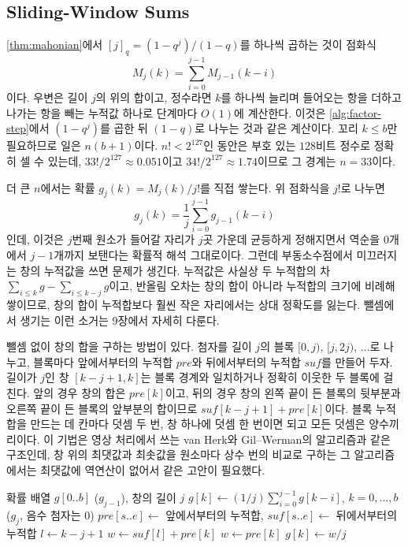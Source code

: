 \subsection{Sliding-Window Sums}

\cref{thm:mahonian}에서 $[j]_q=(1-q^j)/(1-q)$를 하나씩 곱하는 것이 점화식
\[
M_j(k)=\sum_{i=0}^{j-1}M_{j-1}(k-i)
\]
이다. 우변은 길이 $j$의  위의 합이고, 정수라면 $k$를 하나씩 늘리며 들어오는 항을 더하고 나가는 항을 빼는 누적값 하나로 단계마다 $O(1)$에 계산한다. 이것은 \cref{alg:factor-step}에서 $(1-q^j)$를 곱한 뒤 $(1-q)$로 나누는 것과 같은 계산이다. 꼬리 $k\le b$만 필요하므로 일은 $n(b+1)$이다. $n!<2^{127}$인 동안은 부호 있는 $128$비트 정수로 정확히 셀 수 있는데, $33!/2^{127}\approx0.051$이고 $34!/2^{127}\approx1.74$이므로 그 경계는 $n=33$이다.

더 큰 $n$에서는 확률 $g_j(k)=M_j(k)/j!$를 직접 쌓는다. 위 점화식을 $j!$로 나누면
\[
g_j(k)=\frac1j\sum_{i=0}^{j-1}g_{j-1}(k-i)
\]
인데, 이것은 $j$번째 원소가 들어갈 자리가 $j$곳 가운데 균등하게 정해지면서 역순을 $0$개에서 $j-1$개까지 보탠다는 확률적 해석 그대로이다. 그런데 부동소수점에서 미끄러지는 창의 누적값을 쓰면 문제가 생긴다. 누적값은 사실상 두 누적합의 차 $\sum_{i\le k}g-\sum_{i\le k-j}g$이고, 반올림 오차는 창의 합이 아니라 누적합의 크기에 비례해 쌓이므로, 창의 합이 누적합보다 훨씬 작은 자리에서는 상대 정확도를 잃는다. 뺄셈에서 생기는 이런 소거는 9장에서 자세히 다룬다.

뺄셈 없이 창의 합을 구하는 방법이 있다. 첨자를 길이 $j$의 블록 $[0,j)$, $[j,2j)$, $\dots$로 나누고, 블록마다 앞에서부터의 누적합 $\mathit{pre}$와 뒤에서부터의 누적합 $\mathit{suf}$를 만들어 두자. 길이가 $j$인 창 $[k-j+1,k]$는 블록 경계와 일치하거나 정확히 이웃한 두 블록에 걸친다. 앞의 경우 창의 합은 $\mathit{pre}[k]$이고, 뒤의 경우 창의 왼쪽 끝이 든 블록의 뒷부분과 오른쪽 끝이 든 블록의 앞부분의 합이므로 $\mathit{suf}[k-j+1]+\mathit{pre}[k]$이다. 블록 누적합을 만드는 데 칸마다 덧셈 두 번, 창 하나에 덧셈 한 번이면 되고 모든 덧셈은 양수끼리이다. 이 기법은 영상 처리에서 쓰는 van Herk와 Gil--Werman의 알고리즘과 같은 구조인데\cite{vanherk1992,gil1993}, 창 위의 최댓값과 최솟값을 원소마다 상수 번의 비교로 구하는 그 알고리즘에서는 최댓값에 역연산이 없어서 같은 고안이 필요했다.

\begin{algorithm}[t]
\begin{algorithmic}[1]
\Require 확률 배열 $g[0..b]$ ($g_{j-1}$), 창의 길이 $j$
\Ensure $g[k]\gets(1/j)\sum_{i=0}^{j-1}g[k-i]$, $k=0,\dots,b$ ($g_j$, 음수 첨자는 $0$)
 
  \State $\mathit{pre}[s..e]\gets$ 앞에서부터의 누적합, $\mathit{suf}[s..e]\gets$ 뒤에서부터의 누적합
\EndFor
{}
  \State $l\gets k-j+1$ 
    \State $w\gets\mathit{suf}[l]+\mathit{pre}[k]$ 
  \Else
    \State $w\gets\mathit{pre}[k]$
  \EndIf
  \State $g[k]\gets w/j$
\EndFor
\end{algorithmic}
\caption{뺄셈 없는 창의 합으로 Mahonian 확률을 한 단계 넘기기}
\label{alg:block-window}
\end{algorithm}

